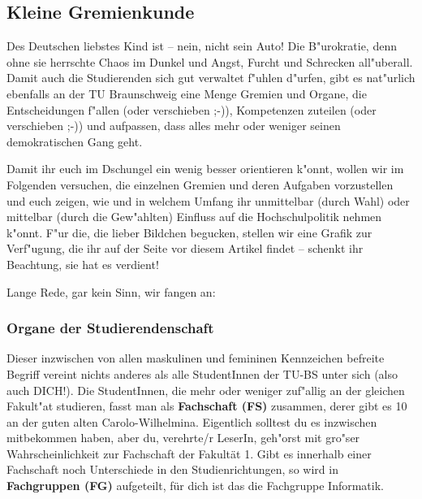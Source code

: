 \begin{multicols}{2}
\subsection{Kleine Gremienkunde}
	Des Deutschen liebstes Kind ist -- nein, nicht sein Auto! Die B"urokratie, denn ohne sie herrschte Chaos im Dunkel und Angst, Furcht und Schrecken all"uberall. Damit auch die Studierenden sich gut verwaltet f"uhlen d"urfen, gibt es nat"urlich ebenfalls an der TU Braunschweig eine Menge Gremien und Organe, die Entscheidungen f"allen (oder verschieben ;-)), Kompetenzen zuteilen (oder verschieben ;-)) und aufpassen, dass alles mehr oder weniger seinen demokratischen Gang geht.

	Damit ihr euch im Dschungel ein wenig besser orientieren k"onnt, wollen wir im Folgenden versuchen, die einzelnen Gremien und deren Aufgaben vorzustellen und euch zeigen, wie und in welchem Umfang ihr unmittelbar (durch Wahl) oder mittelbar (durch die Gew"ahlten) Einfluss auf die Hochschulpolitik nehmen k"onnt. F"ur die, die lieber Bildchen begucken, stellen wir eine Grafik zur Verf"ugung, die ihr auf der Seite vor diesem Artikel findet -- schenkt ihr Beachtung, sie hat es verdient!

	Lange Rede, gar kein Sinn, wir fangen an:

	\subsubsection*{Organe der Studierendenschaft}
		Dieser inzwischen von allen maskulinen und femininen Kennzeichen befreite Begriff vereint nichts anderes als alle StudentInnen der TU-BS unter sich (also auch DICH!). Die StudentInnen, die mehr oder weniger zuf"allig an der gleichen Fakult"at studieren, fasst man als \textbf{Fachschaft (FS)} zusammen, derer gibt es 10 an der guten alten Carolo-Wilhelmina. Eigentlich solltest du es inzwischen mitbekommen haben, aber du, verehrte/r LeserIn, geh"orst mit gro"ser Wahrscheinlichkeit zur Fachschaft der Fakultät 1. Gibt es innerhalb einer Fachschaft noch Unterschiede in den Studienrichtungen, so wird in \textbf{Fachgruppen (FG)} aufgeteilt, für dich ist das die Fachgruppe Informatik.


\end{multicols}
